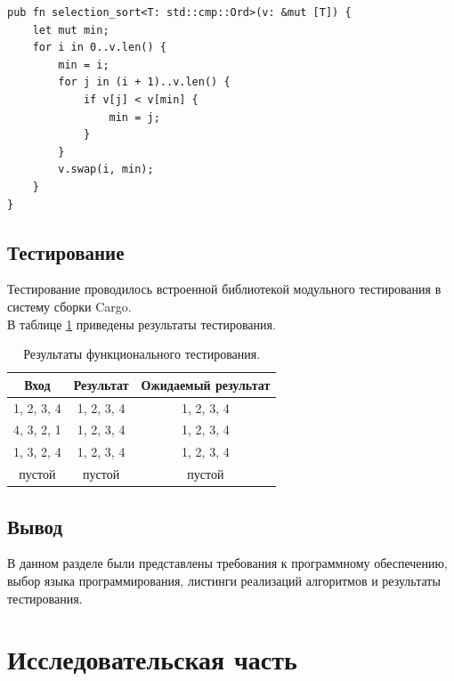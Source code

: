 \documentclass[14pt,russian]{scrartcl}
\begin{document}
\begin{lstlisting}[label=list:selection, caption=Функция сортировки массива методом выбора]
pub fn selection_sort<T: std::cmp::Ord>(v: &mut [T]) {
    let mut min;
    for i in 0..v.len() {
        min = i;
        for j in (i + 1)..v.len() {
            if v[j] < v[min] {
                min = j;
            }
        }
        v.swap(i, min);
    }
}
\end{lstlisting}

\clearpage

\subsection{Тестирование}

Тестирование проводилось встроенной библиотекой модульного тестирования в систему сборки Cargo. \\

В таблице \ref{tab:tests} приведены результаты тестирования.

\begin{table}[h]
    \caption{\centering Результаты функционального тестирования.}
    \centering
    \begin{tabular}{|c|c|c|}
    \hline
    Вход       & Результат  & Ожидаемый результат \\ \hline
    1, 2, 3, 4 & 1, 2, 3, 4 & 1, 2, 3, 4          \\ \hline
    4, 3, 2, 1 & 1, 2, 3, 4 & 1, 2, 3, 4          \\ \hline
    1, 3, 2, 4 & 1, 2, 3, 4 & 1, 2, 3, 4          \\ \hline
    пустой     & пустой     & пустой              \\ \hline
    \end{tabular}
    \label{tab:tests}
\end{table}


\subsection*{Вывод}

В данном разделе были представлены требования к программному обеспечению, выбор языка программирования, листинги реализаций алгоритмов и результаты тестирования.

\section{Исследовательская часть}
\end{document}
